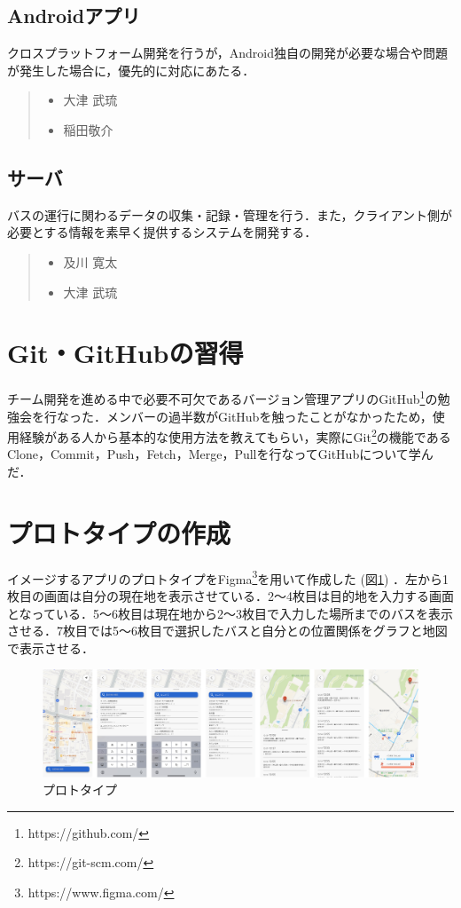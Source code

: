 \subsection{Androidアプリ}
クロスプラットフォーム開発を行うが，Android独自の開発が必要な場合や問題が発生した場合に，優先的に対応にあたる．
\begin{quote}
    \begin{itemize}
        \item 大津 武琉
        \item 稲田敬介
    \end{itemize}
\end{quote}

\subsection{サーバ}
バスの運行に関わるデータの収集・記録・管理を行う．また，クライアント側が必要とする情報を素早く提供するシステムを開発する．
\begin{quote}
    \begin{itemize}
        \item 及川 寛太
        \item 大津 武琉
    \end{itemize}
\end{quote}

\section{Git・GitHubの習得}
チーム開発を進める中で必要不可欠であるバージョン管理アプリのGitHub\footnote{https://github.com/}の勉強会を行なった．メンバーの過半数がGitHubを触ったことがなかったため，使用経験がある人から基本的な使用方法を教えてもらい，実際にGit\footnote{https://git-scm.com/}の機能であるClone，Commit，Push，Fetch，Merge，Pullを行なってGitHubについて学んだ．

\section{プロトタイプの作成}
イメージするアプリのプロトタイプをFigma\footnote{https://www.figma.com/}を用いて作成した (図\ref{fig:prototype_v2}) ．左から1枚目の画面は自分の現在地を表示させている．2〜4枚目は目的地を入力する画面となっている．5〜6枚目は現在地から2〜3枚目で入力した場所までのバスを表示させる．7枚目では5〜6枚目で選択したバスと自分との位置関係をグラフと地図で表示させる．

\begin{figure}[htbp]
    \centering
    \includegraphics[width=12cm]{images/prototype_v2.png}
    \caption{プロトタイプ}
    \label{fig:prototype_v2}
\end{figure}

